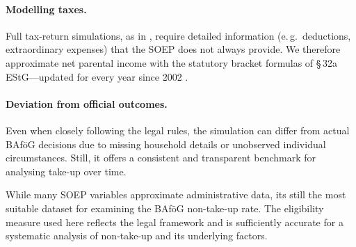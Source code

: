 \paragraph{Modelling taxes.}
Full tax‑return simulations, as in \cite{herber_non-take-up_2019}, require detailed information (e.\,g.\ deductions, extraordinary expenses) that the SOEP does not always provide.  
We therefore approximate net parental income with the statutory bracket formulas of §\,32a EStG—updated for every year since 2002 \citep{estg_law,estg_2025,estg_2024,estg_2023,estg_2022,estg_2021,estg_2020,estg_2019,estg_2018,estg_2017,estg_2016,estg_2015,estg_2014,estg_2013,estg_2012,estg_2007,estg_2006,estg_lohninfo_2012}.  
\paragraph{Deviation from official outcomes.}
Even when closely following the legal rules, the simulation can differ from actual BAföG decisions due to missing household details or unobserved individual circumstances. 
Still, it offers a consistent and transparent benchmark for analysing take-up over time.

While many SOEP variables approximate administrative data, its still the most suitable dataset for examining the BAföG non-take-up rate. 
The eligibility measure used here reflects the legal framework and is sufficiently accurate for a systematic analysis of non-take-up and its underlying factors.

